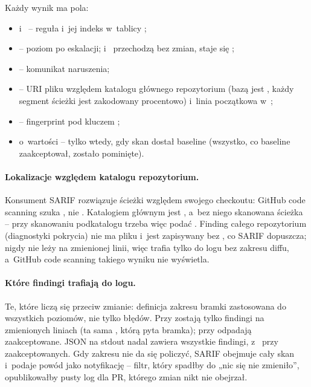 Każdy wynik ma pola:
\begin{itemize}[leftmargin=*]
  \item {} i~ -- reguła i~jej indeks w~tablicy
        ;
  \item {} -- poziom po eskalacji;  i~
        przechodzą bez zmian,  staje się ;
  \item {} -- komunikat naruszenia;
  \item {} -- URI pliku względem katalogu głównego
        repozytorium (bazą jest , każdy segment ścieżki jest
        zakodowany procentowo) i~linia początkowa w~;
  \item {} -- fingerprint pod kluczem
        ;
  \item {} o~wartości  -- tylko wtedy, gdy skan dostał
        baseline (wszystko, co baseline zaakceptował, zostało pominięte).
\end{itemize}

\paragraph{Lokalizacje względem katalogu repozytorium.} Konsument SARIF rozwiązuje ścieżki
względem swojego checkoutu: GitHub code scanning szuka , nie
. Katalogiem głównym jest , a~bez niego
skanowana ścieżka -- przy skanowaniu podkatalogu trzeba więc podać
. Finding całego repozytorium (diagnostyki pokrycia) nie ma
pliku i~jest zapisywany bez , co SARIF dopuszcza; nigdy nie leży na
zmienionej linii, więc trafia tylko do logu bez zakresu diffu, a~GitHub code scanning
takiego wyniku nie wyświetla.

\paragraph{Które findingi trafiają do logu.} Te, które liczą się przeciw zmianie: definicja
zakresu bramki zastosowana do wszystkich poziomów, nie tylko błędów. Przy
 zostają tylko findingi na zmienionych liniach (ta sama
, którą pyta bramka); przy  odpadają
zaakceptowane. JSON na stdout nadal zawiera wszystkie findingi, z~
przy zaakceptowanych. Gdy zakresu nie da się policzyć, SARIF obejmuje cały skan i~podaje
powód jako notyfikację  -- filtr, który spadłby do „nic się nie zmieniło”,
opublikowałby pusty log dla PR, którego zmian nikt nie obejrzał.

